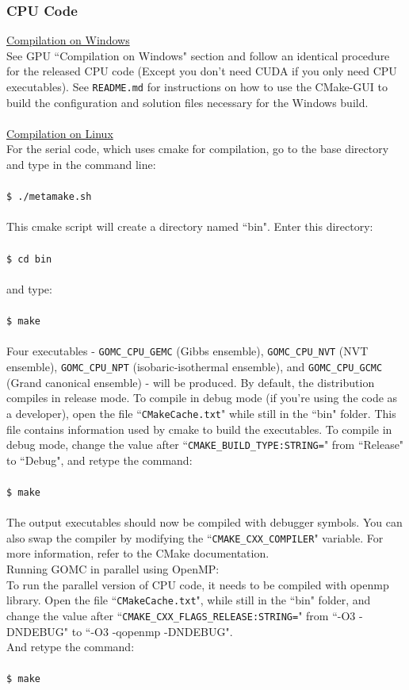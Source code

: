 \subsubsection{CPU Code}
\underline{Compilation on Windows}\\
See GPU ``Compilation on Windows" section and follow an identical procedure for the released CPU code (Except you don't need CUDA if you only need CPU executables). See \texttt{README.md} for instructions on how to use the CMake-GUI to build the configuration and solution files necessary for the Windows build.\\\\
\underline{Compilation on Linux}\\
For the serial code, which uses cmake for compilation, go to the base directory and type in the command line:\\\\
\texttt{\$ ./metamake.sh}\\\\
This cmake script will create a directory named ``bin".  Enter this directory:\\\\
\texttt{\$ cd bin}\\\\
and type:\\\\
\texttt{\$ make}\\\\
Four executables - \texttt{GOMC\_CPU\_GEMC} (Gibbs ensemble), \texttt{GOMC\_CPU\_NVT} (NVT ensemble), \texttt{GOMC\_CPU\_NPT} (isobaric-isothermal ensemble), and \texttt{GOMC\_CPU\_GCMC} (Grand canonical ensemble) - will be produced. By default, the distribution compiles in release mode.  To compile in debug mode (if you're using the code as a developer), open the file ``\texttt{CMakeCache.txt}" while still in the ``bin" folder.  This file contains information used by cmake to build the executables.  To compile in debug mode, change the value after ``\texttt{CMAKE\_BUILD\_TYPE:STRING=}" from ``Release" to ``Debug", and retype the command:\\\\ \texttt{\$ make}\\\\
The output executables should now be compiled with debugger symbols.
You can also swap the compiler by modifying the ``\texttt{CMAKE\_CXX\_COMPILER}" variable. For more information, refer to the CMake documentation.\\
Running GOMC in parallel using OpenMP:\\
To run the parallel version of CPU code, it needs to be compiled with openmp library. Open the file ``\texttt{CMakeCache.txt}", while still in the ``bin" folder, and change the value after ``\texttt{CMAKE\_CXX\_FLAGS\_RELEASE:STRING=}" from ``-O3 -DNDEBUG" to ``-O3 -qopenmp -DNDEBUG".\\
And retype the command:\\\\
\texttt{\$ make}\\\\

